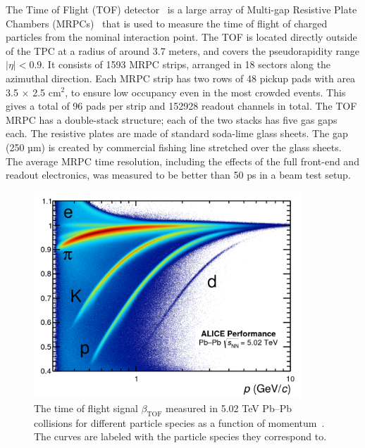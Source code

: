 The Time of Flight (TOF) detector~\cite{TOF1} is a large array of Multi-gap Resistive Plate Chambers (MRPCs)~\cite{TOF2} that is used to measure the time of flight of charged particles from the nominal interaction point. The TOF is located directly outside of the TPC at a radius of around 3.7 meters, and covers the pseudorapidity range $|\eta| < 0.9$. It consists of 1593 MRPC strips, arranged in 18 sectors along the azimuthal direction. Each MRPC strip has two rows of 48 pickup pads with area 3.5 $\times$ 2.5 cm$^2$, to ensure low occupancy even in the most crowded events. This gives a total of 96 pads per strip and 152928 readout channels in total. The TOF MRPC has a double-stack structure; each of the two stacks has five gas gaps each. The resistive plates are made of standard soda-lime glass sheets. The gap (250 µm) is created by commercial fishing line stretched over the glass sheets. The average MRPC time resolution, including the effects of the full front-end and readout electronics, was measured to be better than 50 ps in a beam test setup.

\begin{figure}
    \centering
    \includegraphics[width=0.9\textwidth]{figures/experiment/tof_pid_curves.png}
    \caption{The time of flight signal $\beta_{\text{TOF}}$ measured in 5.02 TeV Pb--Pb collisions for different particle species as a function of momentum~\cite{TOFPIDPlot}. The curves are labeled with the particle species they correspond to.}
    \label{fig:tof_pid_curves}
\end{figure}

